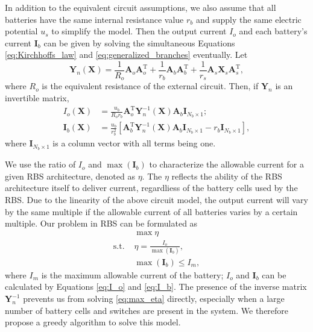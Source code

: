 \documentclass{article}
\def\T{\mathrm{T}}
\begin{document}
In addition to the equivalent circuit assumptions, we also assume that all batteries have the same internal resistance value $r_b$ and supply the same electric potential $u_s$ to simplify the model.
Then the output current $I_o$ and each battery's current $\bm{I}_b$ can be given by solving the simultaneous Equations \ref{eq:Kirchhoffs_law} and \ref{eq:generalized_branches} eventually.
Let
\begin{equation}\label{eq:Yn}
    \bm{Y}_n (\bm{X}) = \frac{1}{R_o} \bm{A}_o\bm{A}_o^\T + \frac{1}{r_b} \bm{A}_b\bm{A}_b^\T + \frac{1}{r_s}\bm{A}_s\bm{X}_s\bm{A}_s^\T,
\end{equation}
where $R_o$ is the equivalent resistance of the external circuit.
Then, if $\bm{Y}_n$ is an invertible matrix,
\begin{align}
    I_o(\bm{X})      & = \frac{u_b}{R_o r_b} \bm{A}_o^\T \bm{Y}_n^{-1}(\bm{X}) \bm{A}_b \bm{I}_{N_b\times 1};\label{eq:I_o}\\
    \bm{I}_b(\bm{X}) & = \frac{u_b}{r_b^2}[\bm{A}_b^\T \bm{Y}_n^{-1}(\bm{X}) \bm{A}_b\bm{I}_{N_b \times 1}  -r_b \bm{I}_{N_b \times 1}],\label{eq:I_b}
\end{align}
where $\bm{I}_{N_b\times 1}$ is a column vector with all terms being one.


We use the ratio of $I_o$ and $\max (\bm{I}_b)$ to characterize the allowable current for a given RBS architecture, denoted as $\eta$.
The $\eta$ reflects the ability of the RBS architecture itself to deliver current, regardliess of the battery cells used by the RBS.
Due to the linearity of the above circuit model, the output current will vary by the same multiple if the allowable current of all batteries varies by a certain multiple.
Our problem in RBS can be formulated as
\begin{align}
    & \max \eta \label{eq:max_eta}\\
    \mathrm{s.t.}\,\, & \eta = \frac{I_o}{\max (\bm{I}_b)}, \\
    & \max (\bm{I}_b) \leq I_m,
\end{align}
where $I_m$ is the maximum allowable current of the battery; $I_o$ and $\bm{I}_b$ can be calculated by Equations \ref{eq:I_o} and \ref{eq:I_b}.
The presence of the inverse matrix $\bm{Y}_n^{-1}$ prevents us from solving \ref{eq:max_eta} directly, especially when a large number of battery cells and switches are present in the system.
We therefore propose a greedy algorithm to solve this model.
\end{document}
